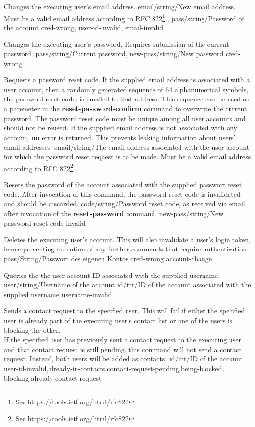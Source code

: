 \documentclass[parskip=full,11pt]{scrartcl}
\begin{document}
{Changes the executing user's email address.}
{email/string/New email address.
Must be a valid email address according to
RFC 822\footnote{See \url{https://tools.ietf.org/html/rfc822}}.,
pass/string/Password of the account}
{}
{cred-wrong, user-id-invalid, email-invalid}
{}

{Changes the executing user's password.
Requires submission of the current password.}
{pass/string/Current password,
new-pass/string/New password}
{}
{cred-wrong}
{}

{Requests a password reset code.
If the supplied email address is associated with a user account, then a
randomly generated sequence of 64 alphanumerical symbols, the password reset
code, is emailed to that address.
This sequence can be used as a paremeter in the \textbf{reset-password-confirm}
command to overwrite the current password.
The password reset code must be unique among all user accounts and should not
be reused.
If the supplied email address is not associated with any account, \textbf{no}
error is returned.
This prevents leaking information about users' email addresses.}
{email/string/The email address associated with the user account for which the
password reset request is to be made.
Must be a valid email address according to
RFC 822\footnote{See \url{https://tools.ietf.org/html/rfc822}}.}
{}
{}
{}

{Resets the password of the account associated with the supplied passwort reset
code.
After invocation of this command, the password reset code is invalidated and
should be discarded.}
{code/string/Password reset code{,} as received via email after invocation of
    the \textbf{reset-password} command,
new-pass/string/New password}
{}
{reset-code-invalid}
{}

{Deletes the executing user's account.
This will also invalidate a user's login token, hence preventing execution of
any further commands that require authentication.}
{pass/String/Passwort des eigenen Kontos}
{}
{cred-wrong}
{account-change}

{Queries the the user account ID associated with the supplied username.}
{user/string/Username of the account}
{id/int/ID of the account associated with the supplied username}
{username-invalid}
{}

{Sends a contact request to the specified user.
This will fail if either the specified user is already part of the executing
user's contact list or one of the users is blocking the other.
\\If the specified user has previously sent a contact request to the executing
user and that contact request is still pending{,} this command will not send a
contact request.
Instead{,} both users will be added as contacts.}
{id/int/ID of the account}
{}
{user-id-invalid,already-in-contacts,contact-request-pending,being-blocked,
blocking-already}
{contact-request}
\end{document}
